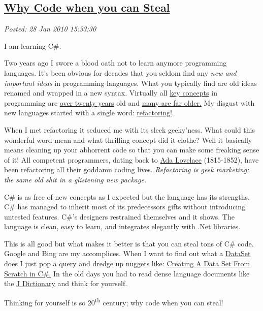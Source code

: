 %

\subsection*{\href{http://bakerjd99.wordpress.com/2010/01/28/why-code-when-you-can-steal/}{Why Code when you can Steal}}


\noindent\emph{Posted: 28 Jan 2010 15:33:30}
\vspace{6pt}

I am learning C\#.

Two years ago I swore a blood oath not to learn anymore programming
languages. It's been obvious for decades that you seldom find any
\emph{new and important ideas} in programming languages. What you
typically find are old ideas renamed and wrapped in a new syntax.
Virtually all
\href{http://www.cse.lehigh.edu/~gtan/historyOfFP/historyOfFP.html}{key
concepts} in programming are
\href{http://www.exforsys.com/tutorials/oops/the-history-of-object-oriented-programming.html}{over
twenty years} old and
\href{http://mathworld.wolfram.com/TuringMachine.html}{many are far
older.} My disgust with new languages started with a single word:
\href{http://c2.com/cgi/wiki?WhatIsRefactoring}{refactoring!}

When I met refactoring it seduced me with its sleek geeky'ness. What
could this wonderful word mean and what thrilling concept did it clothe?
Well it basically means cleaning up your abhorrent code so that you can
make some freaking sense of it! All competent programmers, dating back
to \href{http://www.sdsc.edu/ScienceWomen/lovelace.html}{Ada Lovelace}
(1815-1852), have been refactoring all their goddamn coding lives.
\emph{Refactoring is geek marketing: the same old shit in a glistening
new package.}

C\# is as free of new concepts as I expected but the language has its
strengths. C\# has managed to inherit most of its predecessors gifts
without introducing untested features. C\#'s designers restrained
themselves and it shows. The language is clean, easy to learn, and
integrates elegantly with .Net libraries.

This is all good but what makes it better is that you can steal tons of
C\# code. Google and Bing are my accomplices. When I want to find out
what a
\href{http://msdn.microsoft.com/en-us/library/system.data.dataset.aspx}{DataSet}
does I just pop a query and dredge up nuggets like:
\href{http://rhondatipton.net/2008/01/12/creating-a-data-set-from-scratch-in-c/}{Creating
A Data Set From Scratch in C\#.} In the old days you had to read dense
language documents like the
\href{http://www.jsoftware.com/help/dictionary/title.htm}{J Dictionary}
and think for yourself.

Thinking for yourself is so 20\textsuperscript{th} century; why code when you can steal!


%
